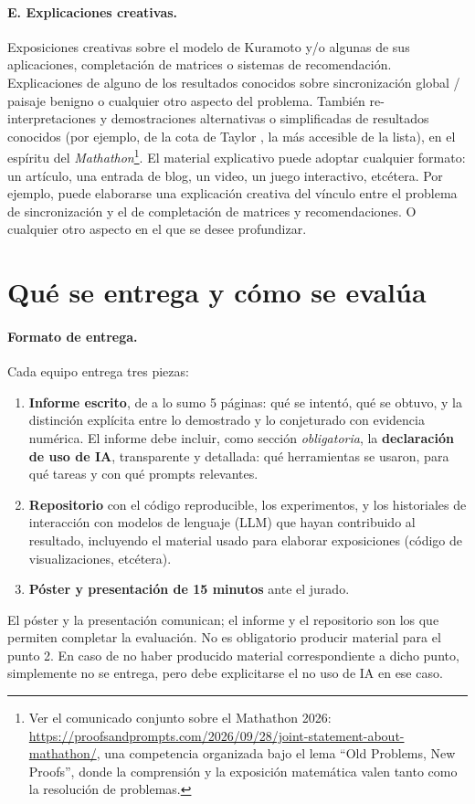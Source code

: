 \documentclass[11pt,a4paper]{article}
\begin{document}
\paragraph{E. Explicaciones creativas.} Exposiciones creativas sobre el modelo de Kuramoto y/o algunas de sus aplicaciones, completación de matrices o sistemas de recomendación. Explicaciones de alguno de los resultados conocidos sobre sincronización global / paisaje benigno o cualquier otro aspecto del problema. También re-interpretaciones y demostraciones alternativas o simplificadas de resultados conocidos (por ejemplo, de la cota de Taylor \cite{taylor2012}, la más accesible de la lista), en el espíritu del \emph{Mathathon}\footnote{Ver el comunicado conjunto sobre el Mathathon 2026: \url{https://proofsandprompts.com/2026/09/28/joint-statement-about-mathathon/}, una competencia organizada bajo el lema ``Old Problems, New Proofs'', donde la comprensión y la exposición matemática valen tanto como la resolución de problemas.}. El material explicativo puede adoptar cualquier formato: un artículo, una entrada de blog, un video, un juego interactivo, etcétera. Por ejemplo, puede elaborarse una explicación creativa del vínculo entre el problema de sincronización y el de completación de matrices y recomendaciones. O cualquier otro aspecto en el que se desee profundizar.

\section*{Qué se entrega y cómo se evalúa}

\paragraph{Formato de entrega.}
Cada equipo entrega tres piezas:
\begin{enumerate}
    \item \textbf{Informe escrito}, de a lo sumo 5 páginas: qué se intentó, qué se obtuvo, y la distinción explícita entre lo demostrado y lo conjeturado con evidencia numérica. El informe debe incluir, como sección \emph{obligatoria}, la \textbf{declaración de uso de IA}, transparente y detallada: qué herramientas se usaron, para qué tareas y con qué prompts relevantes.
    \item \textbf{Repositorio} con el código reproducible, los experimentos, y los historiales de interacción con modelos de lenguaje (LLM) que hayan contribuido al resultado, incluyendo el material usado para elaborar exposiciones (código de visualizaciones, etcétera).
    \item \textbf{Póster y presentación de 15 minutos} ante el jurado.
\end{enumerate}
El póster y la presentación comunican; el informe y el repositorio son los que permiten completar la evaluación. No es obligatorio producir material para el punto 2. En caso de no haber producido material correspondiente a dicho punto, simplemente no se entrega, pero debe explicitarse el no uso de IA en ese caso.
\end{document}
